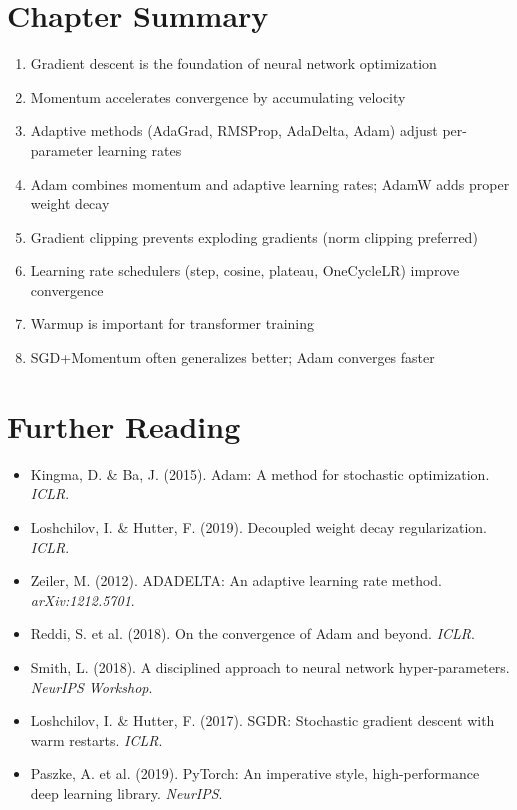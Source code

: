 \section{Chapter Summary}

\begin{enumerate}
    \item Gradient descent is the foundation of neural network optimization
    \item Momentum accelerates convergence by accumulating velocity
    \item Adaptive methods (AdaGrad, RMSProp, AdaDelta, Adam) adjust per-parameter learning rates
    \item Adam combines momentum and adaptive learning rates; AdamW adds proper weight decay
    \item Gradient clipping prevents exploding gradients (norm clipping preferred)
    \item Learning rate schedulers (step, cosine, plateau, OneCycleLR) improve convergence
    \item Warmup is important for transformer training
    \item SGD+Momentum often generalizes better; Adam converges faster
\end{enumerate}

\section{Further Reading}

\begin{itemize}
    \item Kingma, D. \& Ba, J. (2015). Adam: A method for stochastic optimization. \textit{ICLR}.
    \item Loshchilov, I. \& Hutter, F. (2019). Decoupled weight decay regularization. \textit{ICLR}.
    \item Zeiler, M. (2012). ADADELTA: An adaptive learning rate method. \textit{arXiv:1212.5701}.
    \item Reddi, S. et al. (2018). On the convergence of Adam and beyond. \textit{ICLR}.
    \item Smith, L. (2018). A disciplined approach to neural network hyper-parameters. \textit{NeurIPS Workshop}.
    \item Loshchilov, I. \& Hutter, F. (2017). SGDR: Stochastic gradient descent with warm restarts. \textit{ICLR}.
    \item Paszke, A. et al. (2019). PyTorch: An imperative style, high-performance deep learning library. \textit{NeurIPS}.
\end{itemize}
